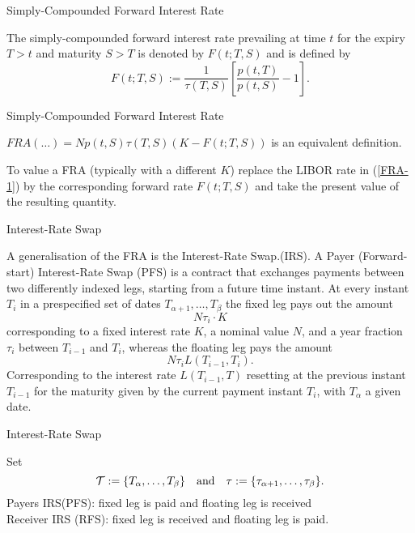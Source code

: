 {Simply-Compounded Forward Interest Rate}

The simply-compounded forward interest rate prevailing at time $t$
for the expiry $T>t$ and maturity $S>T$ is denoted by $F(t;T,S)$
and is defined by
\begin{equation}
F(t;T,S):=\frac{1}{\tau(T,S)} \left[\frac{p(t,T)}{p(t,S)}-1\right].
\end{equation}

{Simply-Compounded Forward Interest Rate}


	$FRA(\ldots)=Np(t,S)\tau(T,S)(K-F(t; T,S))$ is an
equivalent definition.

	To value a FRA (typically with a different $K$) replace the LIBOR rate in (\ref{FRA-1}) by
the corresponding forward rate $F(t;T,S)$ and take the present
value of the resulting quantity.



{Interest-Rate Swap}

A generalisation
of the FRA is the Interest-Rate Swap.(IRS). A Payer (Forward-start)
Interest-Rate Swap (PFS) is a contract that exchanges payments
between two differently indexed legs, starting from a future time
instant. At every instant $T_i$ in a prespecified set of dates
$T_{\alpha+1},\ldots ,T_{\beta}$ the fixed leg pays out the amount
$$
N\tau_i\cdot K
$$
corresponding to a fixed interest rate $K$, a
nominal value $N$, and a year fraction $\tau_i$ between $T_{i-1}$
and $T_i$, whereas the floating leg pays the amount
$$
N\tau_i L(T_{i-1},T_i).
$$
Corresponding to the interest rate
$L(T_{i-1},T)$ resetting at the previous instant $T_{i-1}$ for the
maturity given by the current payment instant $T_i$, with
$T_{\alpha}$ a given date.


{Interest-Rate Swap}

Set
$${\cal T}:=\{T_{\alpha},\ldots ,T_{\beta}\}\quad\mbox{and}\quad
\tau:=\{\tau_{\alpha+1},\ldots,\tau_{\beta}\}.
$$
Payers IRS(PFS):
fixed leg is paid and floating leg is received \\
Receiver IRS (RFS): fixed leg is received and floating leg is
paid.

